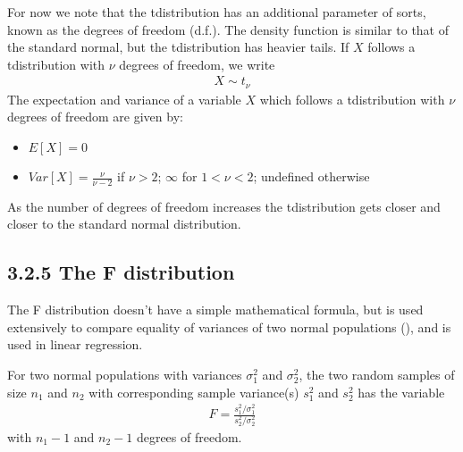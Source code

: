 \documentclass[letterpaper,10pt,english]{jupyterBook}
\begin{document}
\sphinxAtStartPar
For now we note that the t\sphinxhyphen{}distribution has an additional parameter of sorts, known as the degrees of freedom (d.f.). The density function is similar to that of the standard normal, but the t\sphinxhyphen{}distribution has heavier tails. If \(X\) follows a t\sphinxhyphen{}distribution with \(\nu\) degrees of freedom, we write
\begin{equation*}
\begin{split}X \sim t_\nu\end{split}
\end{equation*}
\sphinxAtStartPar
The expectation and variance of a variable \(X\) which follows a t\sphinxhyphen{}distribution with \(\nu\) degrees of freedom are given by:
\begin{itemize}
\item {} 
\sphinxAtStartPar
\(E[X] = 0\)

\item {} 
\sphinxAtStartPar
\(Var[X] = \frac{\nu}{\nu-2}\) if \(\nu>2\); \(\infty\) for \(1<\nu<2\); undefined otherwise

\end{itemize}

\sphinxAtStartPar
As the number of degrees of freedom increases the t\sphinxhyphen{}distribution gets closer and closer to the standard normal distribution.


\subsection{3.2.5 The F distribution}
\label{\detokenize{03.c. Continuous Probability Distributions:the-f-distribution}}
\sphinxAtStartPar
The F distribution doesn’t have a simple mathematical formula, but is used extensively to compare equality of variances of two normal populations (), and is used in linear regression.

\sphinxAtStartPar
For two normal populations with variances \(\sigma_1^2\) and \(\sigma_2^2\), the two random samples of size \(n_1\) and \(n_2\) with corresponding sample variance(s) \(s_1^2\) and \(s_2^2\) has the variable
\begin{equation*}
\begin{split}F = \frac{s_1^2/\sigma_1^2}{s_2^2/\sigma_2^2}\end{split}
\end{equation*}
\sphinxAtStartPar
with \(n_1-1\) and \(n_2-1\) degrees of freedom.
\end{document}
